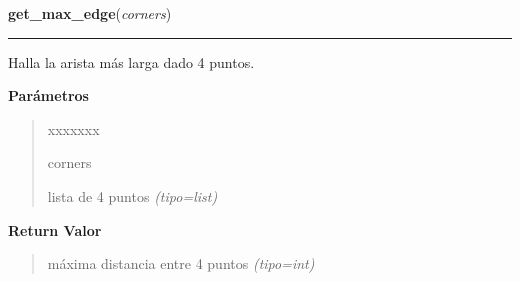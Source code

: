 \hspace{.8\funcindent}\begin{boxedminipage}{\funcwidth}

    \raggedright \textbf{get\_max\_edge}(\textit{corners})

    \vspace{-1.5ex}

    \rule{\textwidth}{0.5\fboxrule}
\setlength{\parskip}{2ex}
Halla la arista más larga dado 4 puntos.

\setlength{\parskip}{1ex}
      \textbf{Parámetros}
      \vspace{-1ex}

      \begin{quote}
        \begin{Ventry}{xxxxxxx}

          \item[corners]


lista de 4 puntos
            {\it (tipo=list)}

        \end{Ventry}

      \end{quote}

      \textbf{Return Valor}
    \vspace{-1ex}

      \begin{quote}

máxima distancia entre 4 puntos
      {\it (tipo=int)}

      \end{quote}

    \end{boxedminipage}

    \label{src:functions:get_external_corners}

    \vspace{0.5ex}

